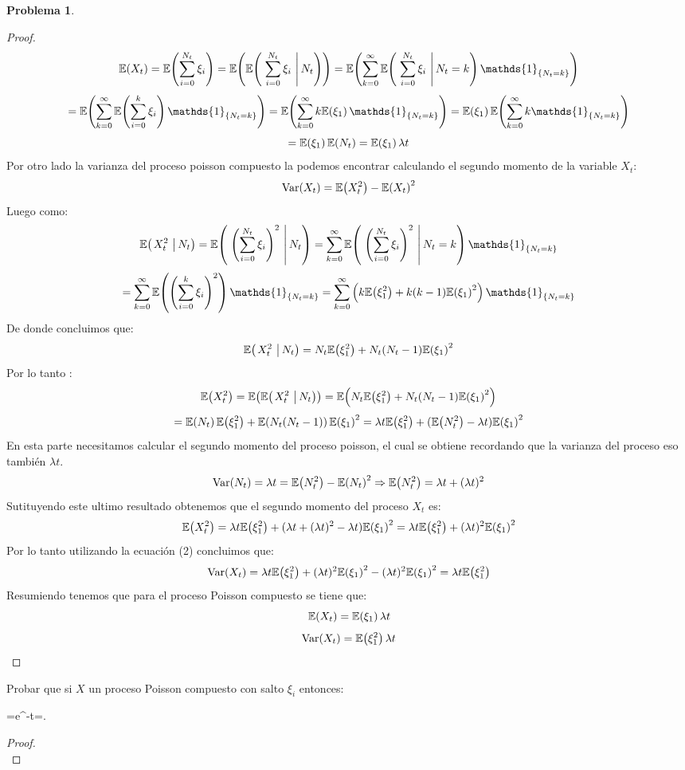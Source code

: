 \documentclass[a5paper,oneside]{amsart}
\theoremstyle{plain}
\theoremstyle{definition}
\newtheorem{problema}{Problema}
\begin{document}
\begin{problema}
\begin{proof}
$$
\esp{X_t}=\esp{\sum_{i=0}^{N_t}\xi_i}=\esp{\espc{\sum_{i=0}^{N_t}\xi_i}{N_t}}=\esp{\sum_{k=0}^{\infty}\espc{\sum_{i=0}^{N_t}\xi_i}{N_t=k}\mathds{1}_{\set{N_t=k}}}
$$
$$
=\esp{\sum_{k=0}^{\infty}\esp{\sum_{i=0}^{k}\xi_i}\mathds{1}_{\set{N_t=k}}}=\esp{\sum_{k=0}^{\infty}k\esp{\xi_1}\mathds{1}_{\set{N_t=k}}}=\esp{\xi_1}\esp{\sum_{k=0}^{\infty}k\mathds{1}_{\set{N_t=k}}}
$$
$$
=\mathbb{E}\! \left( \xi_1 \right)\mathbb{E}\! \left( N_t \right)=\mathbb{E}\! \left( \xi_1 \right)\lambda t
$$
Por otro lado la varianza del proceso poisson compuesto la podemos  encontrar  calculando el segundo momento de la variable $X_t$:
\begin{equation}
\text{Var}\! \left( X_t \right)=\mathbb{E}\! \left( X_t^2 \right)-\mathbb{E}\! \left( X_t \right)^2
\end{equation}
Luego como:
$$
\espc{X_t^2}{N_t}=\espc{\paren{\sum_{i=0}^{N_t}\xi_i}^2}{N_t}=\sum_{k=0}^{\infty}\espc{\paren{\sum_{i=0}^{N_t}\xi_i}^2}{N_t=k}\mathds{1}_{\set{N_t=k}}
$$
$$
=\sum_{k=0}^{\infty}\esp{\paren{\sum_{i=0}^{k}\xi_i}^2}\mathds{1}_{\set{N_t=k}}=\sum_{k=0}^{\infty}\paren{k\esp{\xi_1^2}+k(k-1)\esp{\xi_1}^2}\mathds{1}_{\set{N_t=k}}
$$
De donde concluimos que:
$$
\espc{X_t^2}{N_t}=N_t\esp{\xi_1^2}+N_t(N_t-1)\esp{\xi_1}^2
$$
Por lo tanto :
$$
\esp{X_t^2}=\esp{\espc{X_t^2}{N_t}}=\esp{N_t\esp{\xi_1^2}+N_t(N_t-1)\esp{\xi_1}^2}
$$
$$
=\mathbb{E}\! \left( N_t \right)\mathbb{E}\! \left( \xi_1^2 \right)+\mathbb{E}\! \left( N_t(N_t-1) \right)\mathbb{E}\! \left( \xi_1 \right)^2=\lambda t \mathbb{E}\! \left( \xi_1^2 \right)+(\mathbb{E}\! \left( N_t^2 \right)-\lambda t)\mathbb{E}\! \left( \xi_1 \right)^2
$$
En esta parte necesitamos calcular el segundo momento del proceso poisson, el cual se obtiene recordando que la varianza del proceso  eso tambi\'en $\lambda t$. 
$$
\text{Var}\! \left( N_t \right)=\lambda t =\mathbb{E}\! \left( N_t^2 \right)-\mathbb{E}\! \left( N_t \right)^2 \Rightarrow \mathbb{E}\! \left( N_t^2 \right)=\lambda t+ (\lambda t)^2
$$
Sutituyendo este ultimo resultado obtenemos que el segundo momento del proceso $X_t$ es:
$$
\mathbb{E}\! \left( X_t^2 \right)=\lambda t \mathbb{E}\! \left( \xi_1^2 \right)+(\lambda t+ (\lambda t)^2-\lambda t)\mathbb{E}\! \left( \xi_1 \right)^2=\lambda t \mathbb{E}\! \left( \xi_1^2 \right)+(\lambda t)^2\mathbb{E}\! \left( \xi_1 \right)^2
$$
Por lo  tanto utilizando la ecuaci\'on (2) concluimos que:
$$
\text{Var}\! \left( X_t \right)=\lambda t \mathbb{E}\! \left( \xi_1^2 \right)+(\lambda t)^2\mathbb{E}\! \left( \xi_1 \right)^2-(\lambda t)^2\mathbb{E}\! \left( \xi_1 \right)^2=\lambda t \mathbb{E}\! \left( \xi_1^2 \right)
$$
Resumiendo tenemos que para el proceso Poisson compuesto se tiene que:
$$
\mathbb{E}\! \left( X_t \right)=\mathbb{E}\! \left( \xi_1 \right)\lambda t
$$
$$
\text{Var}\! \left( X_t \right)=\mathbb{E}\! \left( \xi_1^2 \right)\lambda t 
$$
\end{proof}
Probar que si $X$ un proceso Poisson compuesto con salto $\xi_i$  entonces:
\begin{esn}
=e^{-\lambda t}\quad{}\quad {}=. 
\end{esn}
\begin{proof}
\begin{equation}

\end{equation}
\end{proof}
\end{problema}
\end{document}
